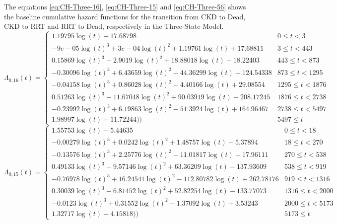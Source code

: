 \documentclass[
]{article}
\begin{document}
The equations \eqref{eq:CH-Three-16}, \eqref{eq:CH-Three-15} and \eqref{eq:CH-Three-56} shows the baseline cumulative hazard functions for the transition from CKD to Dead, CKD to RRT and RRT to Dead, respectively in the Three-State Model.
\begin{equation}
\Lambda_{0,16}(t)=\begin{cases} 1.19795\log(t)+17.68798 & 0 \le t < 3 \\ -9e-05\log(t)^3+3e-04\log(t)^2+1.19761\log(t)+17.68811 & 3 \le t < 443 \\ 0.15869\log(t)^3-2.9019\log(t)^2+18.88018\log(t)-18.22403 & 443 \le t < 873 \\ -0.30096\log(t)^3+6.43659\log(t)^2-44.36299\log(t)+124.54338 & 873 \le t < 1295 \\ -0.04158\log(t)^3+0.86028\log(t)^2-4.40166\log(t)+29.08554 & 1295 \le t < 1876 \\ 0.51263\log(t)^3-11.67048\log(t)^2+90.03919\log(t)-208.17245 & 1876 \le t < 2738 \\ -0.23992\log(t)^3+6.19863\log(t)^2-51.3924\log(t)+164.96467 & 2738 \le t < 5497 \\ 1.98997\log(t)+11.72244)) & 5497 \le t \label{eq:CH-Three-16}\end{cases}
\end{equation}
\begin{equation}
\Lambda_{0,15}(t)=\begin{cases} 1.55753\log(t)-5.44635 & 0 \le t < 18 \\ -0.00279\log(t)^3+0.0242\log(t)^2+1.48757\log(t)-5.37894 & 18 \le t < 270 \\ -0.13576\log(t)^3+2.25776\log(t)^2-11.01817\log(t)+17.96111 & 270 \le t < 538 \\ 0.49133\log(t)^3-9.57146\log(t)^2+63.36209\log(t)-137.93609 & 538 \le t < 919 \\ -0.76978\log(t)^3+16.24541\log(t)^2-112.80782\log(t)+262.78176 & 919 \le t < 1316 \\ 0.30039\log(t)^3-6.81452\log(t)^2+52.82254\log(t)-133.77073 & 1316 \le t < 2000 \\ -0.0123\log(t)^3+0.31552\log(t)^2-1.37092\log(t)+3.53243 & 2000 \le t < 5173 \\ 1.32717\log(t)-4.15818)) & 5173 \le t \label{eq:CH-Three-15}\end{cases}
\end{equation}
\end{document}
